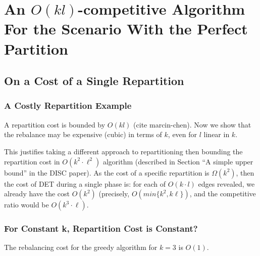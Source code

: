 
\section{An $O(kl)$-competitive Algorithm For the Scenario With the Perfect Partition}

\subsection{On a Cost of a Single Repartition}


\subsubsection{A Costly Repartition Example}

A repartition cost is bounded by $O(kl)$ (cite marcin-chen).
Now we show that the rebalance may be expensive (cubic) in terms of $k$, even for $l$ linear in $k$.

This justifies taking a different approach to repartitioning then bounding the repartition cost in $O(k^2\cdot \ell^2)$ algorithm (described in Section ``A simple upper bound'' in the DISC paper).
As the cost of a specific repartition is $\Omega(k^2)$, then the cost of DET during a single phase is: for each of $O(k \cdot l)$ edges revealed, we already have the cost $O(k^2)$ (precisely, $O(min\{k^2, k\ell\})$, and the competitive ratio would be $O(k^3\cdot \ell)$. 


\subsubsection{For Constant k, Repartition Cost is Constant?}


\begin{lemma} \label{lemma:k=3}
  The rebalancing cost for the greedy algorithm for $k=3$ is $O(1)$.
  \label{rebalancing-cost}
\end{lemma}

